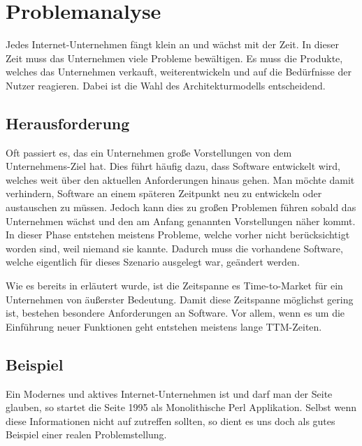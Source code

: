 \chapter{Problemanalyse}
\label{chap:analyse}
Jedes Internet-Unternehmen fängt klein an und wächst mit der Zeit. In dieser Zeit muss das Unternehmen viele Probleme bewältigen. Es muss die Produkte, welches das Unternehmen verkauft, weiterentwickeln und auf die Bedürfnisse der Nutzer reagieren. Dabei ist die Wahl des Architekturmodells entscheidend.

\section{Herausforderung}
\label{sec:herausforderung}
Oft passiert es, das ein Unternehmen große Vorstellungen von dem Unternehmens-Ziel hat. Dies führt häufig dazu, dass Software entwickelt wird, welches weit über den aktuellen Anforderungen hinaus gehen. Man möchte damit verhindern, Software an einem späteren Zeitpunkt neu zu entwickeln oder austauschen zu müssen. Jedoch kann dies zu großen Problemen führen sobald das Unternehmen wächst und den am Anfang genannten Vorstellungen näher kommt. In dieser Phase entstehen meistens Probleme, welche vorher nicht berücksichtigt worden sind, weil niemand sie kannte. Dadurch muss die vorhandene Software, welche eigentlich für dieses Szenario ausgelegt war, geändert werden.

Wie es bereits in  erläutert wurde, ist die Zeitspanne es Time-to-Market für ein Unternehmen von äußerster Bedeutung. Damit diese Zeitspanne möglichst gering ist, bestehen besondere Anforderungen an Software. Vor allem, wenn es um die Einführung neuer Funktionen geht entstehen meistens lange TTM-Zeiten. 

\section{Beispiel}
\label{sec:beispielEbay}
Ein Modernes und aktives Internet-Unternehmen ist \ebay und darf man der Seite \cite{highscalability} glauben, so startet die Seite 1995 als Monolithische Perl Applikation. Selbst wenn diese Informationen nicht auf \ebay zutreffen sollten, so dient es uns doch als gutes Beispiel einer realen Problemstellung.

